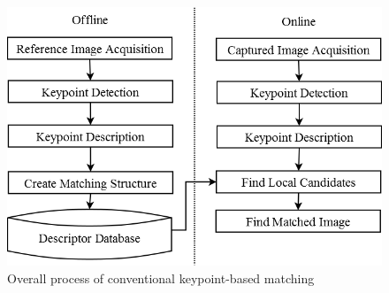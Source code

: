 
\begin{figure}[hb!]
\centering
\includegraphics[width=1.0\columnwidth]{1_intro/process}
\caption{Overall process of conventional keypoint-based matching}
\label{fig:on_offline_process}
\end{figure}

